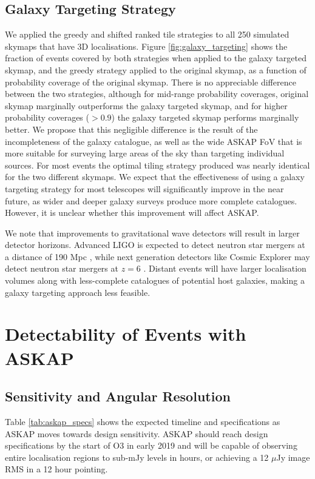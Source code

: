 \subsection{Galaxy Targeting Strategy}
We applied the greedy and shifted ranked tile strategies to all 250 simulated skymaps that have 3D localisations. Figure \ref{fig:galaxy_targeting} shows the fraction of events covered by both strategies when applied to the galaxy targeted skymap, and the greedy strategy applied to the original skymap, as a function of probability coverage of the original skymap. There is no appreciable difference between the two strategies, although for mid-range probability coverages, original skymap marginally outperforms the galaxy targeted skymap, and for higher probability coverages ($>0.9$) the galaxy targeted skymap performs marginally better. We propose that this negligible difference is the result of the incompleteness of the galaxy catalogue, as well as the wide ASKAP FoV that is more suitable for surveying large areas of the sky than targeting individual sources. For most events the optimal tiling strategy produced was nearly identical for the two different skymaps. We expect that the effectiveness of using a galaxy targeting strategy for most telescopes will significantly improve in the near future, as wider and deeper galaxy surveys produce more complete catalogues. However, it is unclear whether this improvement will affect ASKAP.

We note that improvements to gravitational wave detectors will result in larger detector horizons. Advanced LIGO is expected to detect neutron star mergers at a distance of 190 Mpc \citep{2018LRR....21....3A}, while next generation detectors like Cosmic Explorer may detect neutron star mergers at $z=6$ \citep{2017CQGra..34d4001A}. Distant events will have larger localisation volumes along with less-complete catalogues of potential host galaxies, making a galaxy targeting approach less feasible.



\section{Detectability of Events with ASKAP}
\subsection{Sensitivity and Angular Resolution}
Table \ref{tab:askap_specs} shows the expected timeline and specifications as ASKAP moves towards design sensitivity. ASKAP should reach design specifications by the start of O3 in early 2019 and will be capable of observing entire localisation regions to sub-mJy levels in hours, or achieving a 12 $\mu$Jy image RMS in a 12 hour pointing.

